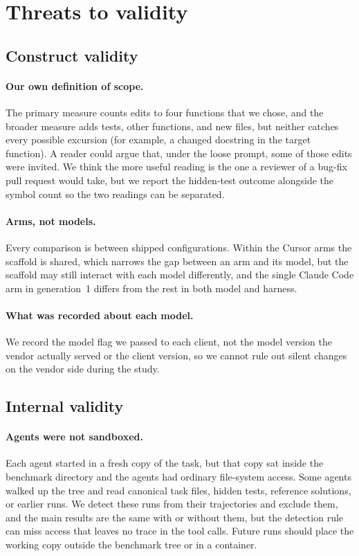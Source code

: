 \section{Threats to validity}
\label{sec:limits}

\subsection{Construct validity}

\paragraph{Our own definition of scope.} The primary measure counts edits to
four functions that we chose, and the broader measure adds tests, other
functions, and new files, but neither catches every possible excursion (for
example, a changed docstring in the target function). A reader could argue that, under the loose
prompt, some of those edits were invited. We think the more useful reading is
the one a reviewer of a bug-fix pull request would take, but we report the
hidden-test outcome alongside the symbol count so the two readings can be
separated.

\paragraph{Arms, not models.} Every comparison is between shipped
configurations. Within the Cursor arms the scaffold is shared, which narrows
the gap between an arm and its model, but the scaffold may still interact
with each model differently, and the single Claude Code arm in generation~1
differs from the rest in both model and harness.

\paragraph{What was recorded about each model.} We record the model flag we
passed to each client, not the model version the vendor actually served or
the client version, so we cannot rule out silent changes on the vendor side
during the study.

\subsection{Internal validity}

\paragraph{Agents were not sandboxed.} Each agent started in a fresh copy of
the task, but that copy sat inside the benchmark directory and the agents
had ordinary file-system access. Some agents walked up the tree and read
canonical task files, hidden tests, reference solutions, or earlier runs. We
detect these runs from their trajectories and exclude them, and the main
results are the same with or without them, but the detection rule can miss
access that leaves no trace in the tool calls. Future runs should place the
working copy outside the benchmark tree or in a container.

